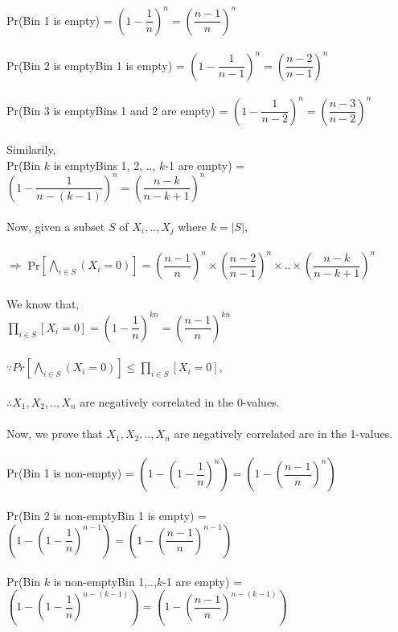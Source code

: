 \documentclass{article}
\begin{document}
Pr(Bin 1 is empty) = $\left(1-\dfrac{1}{n}\right)^n = \left(\dfrac{n-1}{n}\right)^n$\\
\\
Pr(Bin 2 is empty\textbar Bin 1 is empty) = $\left(1-\dfrac{1}{n-1}\right)^n = \left(\dfrac{n-2}{n-1}\right)^n$\\
\\
Pr(Bin 3 is empty\textbar Bins 1 and 2 are empty) = $\left(1-\dfrac{1}{n-2}\right)^n = \left(\dfrac{n-3}{n-2}\right)^n$\\
\\
Similarily,\\
Pr(Bin $k$ is empty\textbar Bins 1, 2, .., $k$-1 are empty) = $\left(1-\dfrac{1}{n-(k-1)}\right)^n = \left(\dfrac{n-k}{n-k+1}\right)^n$\\
\\
Now, given a subset $S$ of $X_{i}, .., X_{j}$ where $k = |S|$, \\
\\$\Rightarrow$ Pr$\left[\bigwedge\limits_{i \in S}(X_{i} = 0)\right] = \left(\dfrac{n-1}{n}\right)^n \times \left(\dfrac{n-2}{n-1}\right)^n 
\times .. \times \left(\dfrac{n-k}{n-k+1}\right)^n$\\
\\
We know that, \\
$\prod\limits_{i \in S}\left[X_{i} = 0\right] = \left(1-\dfrac{1}{n}\right)^{kn} = \left(\dfrac{n-1}{n}\right)^{kn}$\\
\\
$\because Pr\left[\bigwedge\limits_{i \in S}(X_{i} = 0)\right] \le \prod\limits_{i \in S}\left[X_{i} = 0\right], $ \\
\\
$\therefore X_{1}, X_{2}, .., X_{n}$ are negatively correlated in the 0-values.\\
\\
Now, we prove that $X_{1}, X_{2}, .., X_{n}$ are negatively correlated are in the 1-values.\\
\\
Pr(Bin 1 is non-empty) = $\left(1-\left(1-\dfrac{1}{n}\right)^n\right) = \left(1-\left(\dfrac{n-1}{n}\right)^n\right)$\\
\\
Pr(Bin 2 is non-empty\textbar Bin 1 is empty) = $\left(1-\left(1-\dfrac{1}{n}\right)^{n-1}\right) = \left(1-\left(\dfrac{n-1}{n}\right)^{n-1}\right)$\\
\\
Pr(Bin $k$ is non-empty\textbar Bin 1,..,$k$-1 are empty) = $\left(1-\left(1-\dfrac{1}{n}\right)^{n-(k-1)}\right) = \left(1-\left(\dfrac{n-1}{n}\right)^{n-(k-1)}\right)$\\
\end{document}
